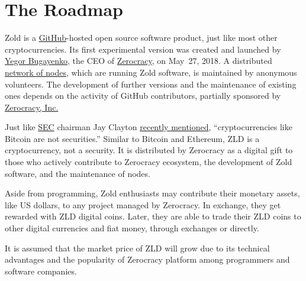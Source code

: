 \documentclass{main}
\begin{document}
\pagebreak

\section*{The Roadmap}

Zold is a \href{https://github.com/zold-io}{GitHub}-hosted open source
software product, just like most other cryptocurrencies.
Its first experimental version was created and launched by \href{https://www.yegor256.com}{Yegor Bugayenko},
the CEO of \href{https://www.zerocracy.com}{Zerocracy}, on May~27, 2018.
A distributed \href{http://www.zold.io/map.html}{network of nodes},
which are running Zold software, is maintained by
anonymous volunteers. The development of further versions and the
maintenance of existing ones depends on the activity of GitHub
contributors, partially sponsored by \href{https://www.zerocracy.com}{Zerocracy, Inc.}

Just like \href{https://www.sec.gov/}{SEC} chairman Jay Clayton
\href{https://www.cnbc.com/video/2018/06/06/sec-chairman-cryptocurrencies-like-bitcoin--not-securities.html}{recently mentioned},
``cryptocurrencies like Bitcoin are not securities.''
Similar to Bitcoin and Ethereum, ZLD is a cryptocurrency, not a security.
It is distributed by Zerocracy as a digital gift to those who
actively contribute to Zerocracy ecosystem, the development of Zold software,
and the maintenance of nodes.

Aside from programming, Zold enthusiasts may contribute their monetary assets,
like US dollars, to any project managed by Zerocracy.
In exchange, they get rewarded with ZLD digital coins.
Later, they are able to trade their ZLD coins to other digital currencies
and fiat money, through exchanges or directly.

It is assumed that the market price of ZLD will grow due to its technical
advantages and the popularity of Zerocracy platform among programmers
and software companies.
\end{document}
